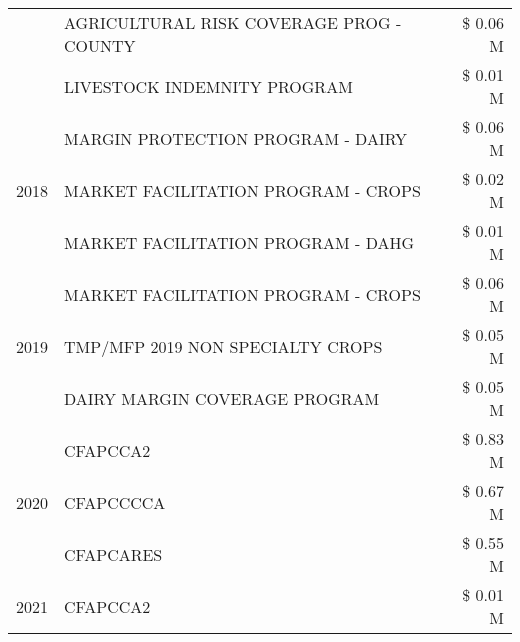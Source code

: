 \begin{tabular}{llr}
 & AGRICULTURAL RISK COVERAGE PROG - COUNTY & \$ 0.06 M \\
 & LIVESTOCK INDEMNITY PROGRAM & \$ 0.01 M \\
\cline{1-3}
\multirow[t]{3}{*}{2018} & MARGIN PROTECTION PROGRAM - DAIRY & \$ 0.06 M \\
 & MARKET FACILITATION PROGRAM - CROPS & \$ 0.02 M \\
 & MARKET FACILITATION PROGRAM - DAHG & \$ 0.01 M \\
\cline{1-3}
\multirow[t]{3}{*}{2019} & MARKET FACILITATION PROGRAM - CROPS & \$ 0.06 M \\
 & TMP/MFP 2019 NON SPECIALTY CROPS & \$ 0.05 M \\
 & DAIRY MARGIN COVERAGE PROGRAM & \$ 0.05 M \\
\cline{1-3}
\multirow[t]{3}{*}{2020} & CFAPCCA2 & \$ 0.83 M \\
 & CFAPCCCCA & \$ 0.67 M \\
 & CFAPCARES & \$ 0.55 M \\
\cline{1-3}
2021 & CFAPCCA2 & \$ 0.01 M \\
\cline{1-3}
\bottomrule
\end{tabular}
